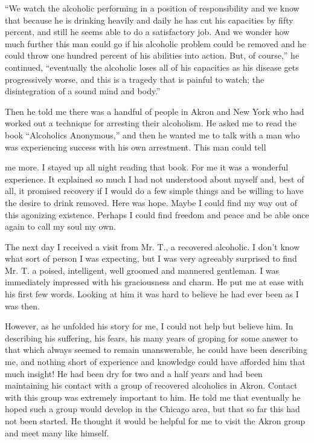 \begin{biblechapter}
“We watch the alcoholic performing in a position of responsibility and we know that because he is drinking heavily and daily he has cut his capacities by fifty percent, and still he seems able to do a satisfactory job. And we wonder how much further this man could go if his alcoholic problem could be removed and he could throw one hundred percent of his abilities into action. But, of course,” he continued, “eventually the alcoholic loses all of his capacities as his disease gets progressively worse, and this is a tragedy that is painful to watch; the disintegration of a sound mind and body.”

Then he told me there was a handful of people in Akron and New York who had worked out a technique for arresting their alcoholism. He asked me to read the book “Alcoholics Anonymous,” and then he wanted me to talk with a man who was experiencing success with his own arrestment. This man could tell

me more. I stayed up all night reading that book. For me it was a wonderful experience. It explained so much I had not understood about myself and, best of all, it promised recovery if I would do a few simple things and be willing to have the desire to drink removed. Here was hope. Maybe I could find my way out of this agonizing existence. Perhaps I could find freedom and peace and be able once again to call my soul my own.

The next day I received a visit from Mr. T., a recovered alcoholic. I don’t know what sort of person I was expecting, but I was very agreeably surprised to find Mr. T. a poised, intelligent, well groomed and mannered gentleman. I was immediately impressed with his graciousness and charm. He put me at ease with his first few words. Looking at him it was hard to believe he had ever been as I was then.

However, as he unfolded his story for me, I could not help but believe him. In describing his suffering, his fears, his many years of groping for some answer to that which always seemed to remain unanswerable, he could have been describing me, and nothing short of experience and knowledge could have afforded him that much insight! He had been dry for two and a half years and had been maintaining his contact with a group of recovered alcoholics in Akron. Contact with this group was extremely important to him. He told me that eventually he hoped such a group would develop in the Chicago area, but that so far this had not been started. He thought it would be helpful for me to visit the Akron group and meet many like himself.


\end{biblechapter}
